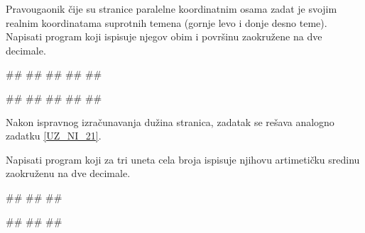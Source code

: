 \begin{Exercise}[label=UZ_NI_25] 
Pravougaonik čije su stranice paralelne koordinatnim osama zadat je svojim realnim 
koordinatama suprotnih temena (gornje levo i donje desno teme). Napisati program koji 
ispisuje njegov obim i površinu zaokružene na dve decimale. 

\begin{maxitest}
\begin{upotreba}{1}
#\naslovInt#
##
##
##
##
\end{upotreba}
\end{maxitest}

\begin{maxitest}
\begin{upotreba}{2}
#\naslovInt#
##
##
##
##
\end{upotreba}
\end{maxitest}
\end{Exercise}
\ifresenja
\begin{Answer}[ref=UZ_NI_25]

Nakon ispravnog izračunavanja dužina stranica, zadatak se rešava analogno zadatku \ref{UZ_NI_21}.
\end{Answer}
\fi



\begin{Exercise}[label=UZ_NI_26] 
Napisati program koji za tri uneta cela broja ispisuje njihovu artimetičku sredinu zaokruženu na dve decimale.

\begin{miditest}
\begin{upotreba}{1}
#\naslovInt#
##
##
\end{upotreba}
\end{miditest}
\begin{miditest}
\begin{upotreba}{2}
#\naslovInt#
##
##
\end{upotreba}
\end{miditest}

\end{Exercise}
\ifresenja
\begin{Answer}[ref=UZ_NI_26]
\end{Answer}
\fi


